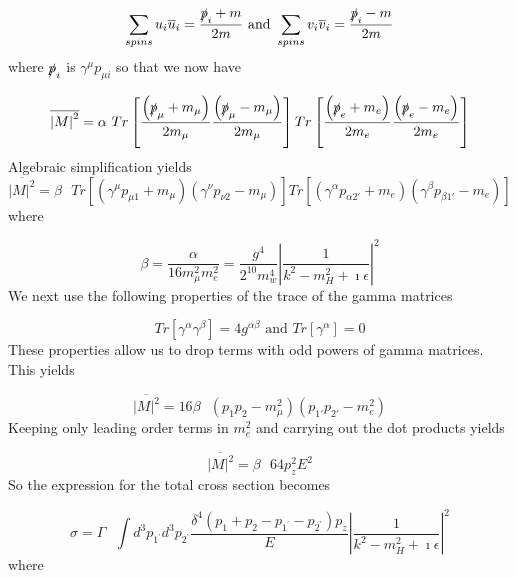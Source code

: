 \documentclass{article}
\begin{document}
\begin{equation}
\sum_{spins} u_i\overline{u}_i=\frac{\slashed{p}_i+m}{2m} \text{  and  } \sum_{spins} v_i\overline{v}_i=\frac{\slashed{p}_i-m}{2m}
\end{equation}where $\slashed p_i$ is $\gamma^\mu p_{\mu i}$
so that we now have

\begin{equation}
\overline{\left|M\right|^2}=\alpha\text{ } Tr\left[\frac{\left(\slashed{p}_\mu+m_\mu\right)}{2m_\mu}\frac{\left(\slashed{p}_\mu-m_\mu\right)}{2m_\mu}\right]Tr\left[\frac{\left(\slashed{p}_e+m_e\right)}{2m_e}\frac{\left(\slashed{p}_e-m_e\right)}{2m_e}\right]
\end{equation}
Algebraic simplification yields
\begin{equation}
\overline{\left|M\right|^2}=\beta\text{ } Tr\left[\left(\gamma^\mu p_{\mu 1}+m_\mu\right)\left(\gamma^\nu p_{\nu 2}-m_\mu\right)\right]Tr\left[\left(\gamma^\alpha p_{\alpha 2'}+m_e\right)\left(\gamma^\beta p_{\beta 1'}-m_e\right)\right]
\end{equation}
where

\begin{equation}
\beta=\frac{\alpha}{16m_\mu^2m_e^2}=\frac{g^4}{2^{10}m_w^4}\left|\frac{1}{k^2-m_H^2+\imath\epsilon}\right|^2
\end{equation}
We next use the following properties of the trace of the gamma matrices

\begin{equation}
Tr\left[\gamma^\alpha\gamma^\beta\right]=4g^{\alpha\beta}\text{  and  }Tr\left[\gamma^\alpha\right]=0
\end{equation}
These properties allow us to drop terms with odd powers of gamma matrices.  This yields

\begin{equation}
\overline{\left|M\right|^2}=16\beta\text{ } \left(p_1p_2-m_\mu^2\right)\left(p_{1'}p_{2'}-m_e^2\right)
\end{equation}
Keeping only leading order terms in $m_e^2$ and carrying out the dot products yields

\begin{equation}
\overline{\left|M\right|^2}=\beta\text{ } 64p_z^2E^2
\end{equation}
So the expression for the total cross section becomes

\begin{equation}
\sigma=\Gamma\text{  }\int d^3p_{1^{'}}d^3p_{2^{'}}\frac{\delta^4\left(p_1+p_2-p_{1^{'}}-p_{2^{'}}\right)p_z}{E}\left|\frac{1}{k^2-m_H^2+\imath\epsilon}\right|^2
\end{equation}
where
\end{document}
